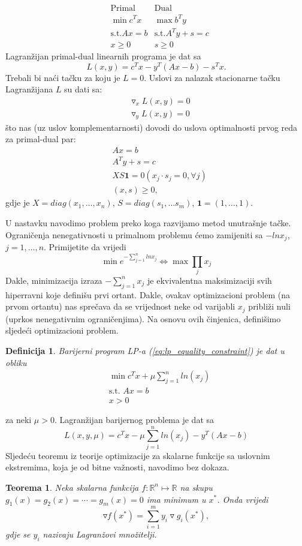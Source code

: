 \documentclass[a4paper, utf8, 11pt, colorlinks]{article}
\newtheorem{definition}{Definicija}
\newtheorem{thm}{Teorema}
\begin{document}
$$ \begin{array}{lll}
	&\mbox{Primal}            & \mbox{Dual}     \\
	&\min  c^T x              & \max  b^T y \\
	& \mbox{s.t.} Ax = b      &   \mbox{s.t.} A^Ty + s = c \\
	& x \geq 0                &   s \geq 0
\end{array}
$$
Lagranžijan primal-dual linearnih programa je dat sa 
\begin{equation}
	L(x,y) = c^Tx - y^T(Ax - b) - s^T x.
\end{equation}
Trebali bi naći tačku za koju je $L = 0$. Uslovi za nalazak stacionarne tačku Lagranžijana $L$ su dati sa:
\begin{align}
	&\triangledown_x L(x,y) = 0\\
	&\triangledown_y L(x,y) = 0
\end{align} 
što nas (uz uslov komplementarnosti) dovodi do uslova optimalnosti prvog reda za primal-dual par:
\begin{align}
	&Ax = b \\
	&A^T y + s = c \\
	&XS\mathbf{1} = 0 (x_j \cdot s_j =0 , \forall j) \\
	&  (x, s ) \geq 0,
\end{align}
gdje je $X = diag (x_1, \ldots, x_n)$, $S= diag(s_1,\ldots s_m)$, $\mathbf{1}=(1,\ldots, 1)$.

U nastavku navodimo problem preko koga razvijamo metod unutrašnje tačke. Ograničenja nenegativnosti u primalnom problemu ćemo zamijeniti sa $-ln x_j$, $j=1,\ldots,n$.   
Primijetite da vrijedi 
$$\min e^{-\sum_{j=1}^n ln x_j} \Leftrightarrow \max \prod_{j} x_j $$
Dakle, minimizacija izraza $-\sum_{j=1}^n x_j$ je ekvivalentna maksimizaciji svih hiperravni koje definišu prvi ortant. Dakle, ovakav optimizacioni problem (na prvom ortantu) nas sprečava da se vrijednost neke od varijabli $x_j$ približi nuli (uprkos nenegativnim ograničenjima).  Na osnovu ovih činjenica, definišimo sljedeći optimizacioni problem. 

\begin{definition}
	Barijerni program LP-a (\ref{eq:lp_equality_constraint}) je dat u obliku 
	\begin{align*}
		&\min c^T x + \mu \sum_{j=1}^n ln(x_j) \\
		&\mbox{s.t. } A x = b \\
		& x > 0
	\end{align*}
\end{definition}
za neki $\mu >0$. Lagranžijan barijernog problema je dat sa 
$$  L(x, y, \mu) = c^T x - \mu \sum_{j=1}^n ln(x_j)  - y^T(Ax - b) $$
Sljedeću teoremu iz teorije optimizacije  za skalarne funkcije sa uslovnim ekstremima, koja je od bitne važnosti, navodimo   bez dokaza. 
\begin{thm}
	Neka skalarna funkcija  $f:\mathbb{R}^n \mapsto \mathbb{R}$ na skupu $g_1(x)=g_2(x)= \cdots = g_m(x) =0$ ima minimum u $x^*$. Onda vrijedi 
	$$ \triangledown f (x^*) = \sum_{i=1}^m y_i \triangledown g_i(x^*),$$
	gdje se $y_i$ nazivaju Lagranžovi množitelji. 
\end{thm}
\end{document}
